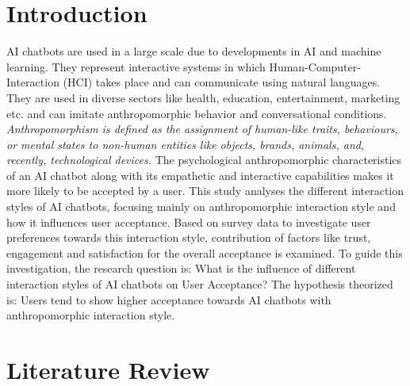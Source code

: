 \documentclass[conference]{IEEEtran}
\begin{document}
\section{Introduction}
AI chatbots are used in a large scale due to developments in AI and machine learning. They represent interactive systems in which Human-Computer-Interaction (HCI) takes place and can communicate using natural languages. They are used in diverse sectors like health, education, entertainment, marketing etc. and can imitate anthropomorphic behavior and conversational conditions\cite{b1}. \textit{Anthropomorphism is defined as the assignment of human-like traits, behaviours, or mental states to non-human entities like objects, brands, animals, and, recently, technological devices.} The psychological anthropomorphic characteristics of an AI chatbot along with its empathetic and interactive capabilities makes it more likely to be accepted by a user\cite{b2}. This study analyses the different interaction styles of AI chatbots, focusing mainly on anthropomorphic interaction style and how it influences user acceptance. Based on survey data to investigate user preferences towards this interaction style, contribution of factors like trust, engagement and satisfaction for the overall acceptance is examined. To guide this investigation, the research question is: What is the influence of different interaction styles of AI chatbots on User Acceptance? The hypothesis theorized is: Users tend to show higher acceptance towards AI chatbots with anthropomorphic interaction style.

\section{Literature Review}
\end{document}
